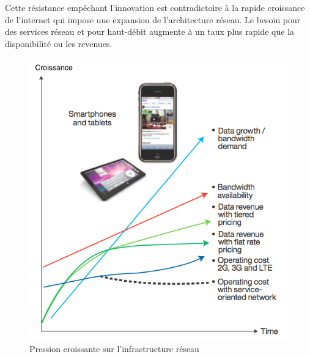 

Cette résistance empêchant l'innovation est contradictoire à la rapide croissance de l'internet qui impose une expansion de l'architecture réseau. 
Le besoin pour des services réseau et pour haut-débit augmente à un taux plus rapide que la disponibilité ou les revenues.



\begin{figure}[!h] %
\includegraphics[width=15cm]{images/IncreasingPressureOnNetworkInfra.png} %
\caption{ Pression croissante sur l'infrastructure réseau \cite{IBMManagingGrowingPainsNeed}} %
\label{image_soleil} %
\end{figure} %


